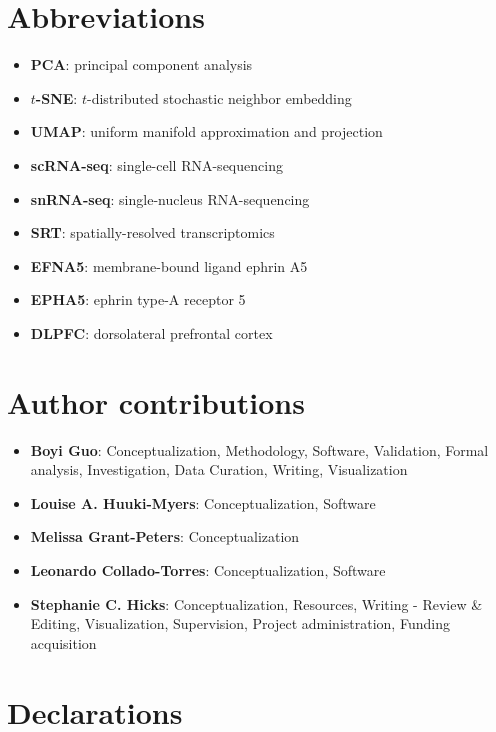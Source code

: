 \documentclass[10pt,twocolumn]{article}
\begin{document}
\section*{Abbreviations}

\begin{itemize}[nosep]
    \item \textbf{PCA}: principal component analysis
    \item \textbf{$t$-SNE}: $t$-distributed stochastic neighbor embedding
    \item \textbf{UMAP}: uniform manifold approximation and projection
    \item \textbf{scRNA-seq}: single-cell RNA-sequencing
    \item \textbf{snRNA-seq}: single-nucleus RNA-sequencing
    \item \textbf{SRT}: spatially-resolved transcriptomics 
    \item \textbf{EFNA5}: membrane-bound ligand ephrin A5
    \item \textbf{EPHA5}: ephrin type-A receptor 5
    \item \textbf{DLPFC}: dorsolateral prefrontal cortex
\end{itemize}

\section*{Author contributions}

\begin{itemize}[nosep]
    \item \textbf{Boyi Guo}:  Conceptualization, Methodology, Software, Validation, Formal analysis, Investigation, Data Curation, Writing, Visualization
    \item \textbf{Louise A. Huuki-Myers}: Conceptualization, Software
    \item \textbf{Melissa Grant-Peters}: Conceptualization
    \item \textbf{Leonardo Collado-Torres}: Conceptualization, Software
    \item \textbf{Stephanie C. Hicks}: Conceptualization, Resources, Writing - Review \& Editing, Visualization, Supervision, Project administration, Funding acquisition
\end{itemize}

\section*{Declarations}
\end{document}
